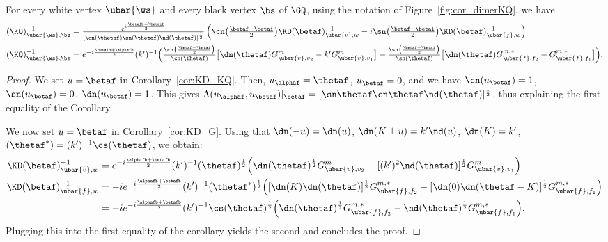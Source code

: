 \documentclass[a4paper,twoside,11pt]{article}
\begin{document}
\begin{cor}\label{cor:gibbsGQ_GD}
For every white vertex $\ubar{\ws}$ and every black vertex $\bs$ of $\GQ$, 
using the notation of Figure~\ref{fig:cor_dimerKQ}, we have
\begin{align*}
(\KQ)^{-1}_{\ubar{\ws},\bs}&=\textstyle\frac{
e^{i\frac{\betafb-\betaib}{2}}}
{[\cn(\thetaf)\sn(\thetaf)\nd(\thetaf)]^{\frac{1}{2}}}
\left(\cn\bigl(\frac{\betaf-\betai}{2}\bigr)\KD(\betaf)^{-1}_{\ubar{v},w}
-i\sn\bigl(\frac{\betaf-\betai}{2}\bigr)\KD(\betaf)^{-1}_{\ubar{f},w}
\right)\\
(\KQ)^{-1}_{\ubar{\ws},\bs}&=\textstyle e^{-i\frac{\betaib+\alphafb}{2}}(k')^{-1}
\Bigl(\frac{\cn\bigl(\frac{\betaf-\betai}{2}\bigr)}{\cn(\thetaf)}
\bigl[\dn(\thetaf) G^m_{\ubar{v},v_2}-k'G^m_{\ubar{v},v_1}\bigr]
-\frac{\sn\bigl(\frac{\betaf-\betai}{2}\bigr)}{\sn(\thetaf)}
\bigl[\dn(\thetaf)G^{m,*}_{\ubar{f},f_2}-G^{m,*}_{\ubar{f},f_1}\bigr]\Bigr).
\end{align*}
\end{cor}
\begin{proof}
We set $u=\betaf$ in Corollary~\ref{cor:KD_KQ}. Then, $u_{\alphaf}=\thetaf$, $u_{\betaf}=0$, and we have $\cn(u_{\betaf})=1$, 
$\sn(u_{\betaf})=0$, $\dn(u_{\betaf})=1$. This gives
$\Lambda(u_{\alphaf},u_{\betaf})\vert_{\betaf}=[\sn\thetaf\cn\thetaf\nd(\thetaf)]^{\frac{1}{2}}$, thus explaining the first equality of the Corollary.

We now set $u=\betaf$ in Corollary~\ref{cor:KD_G}. Using that
$\dn(-u)=\dn(u)$, $\dn(K\pm u)=k'\nd(u)$, $\dn(K)=k'$, $\sc(\thetaf^*)=(k')^{-1}\cs(\thetaf)$, we obtain:
\begin{align*}
\KD(\betaf)^{-1}_{\ubar{v},w}&=e^{-i\frac{\alphafb+\betafb}{2}}(k')^{-1}\sc(\thetaf)^{\frac{1}{2}}
\Bigl(\dn(\thetaf)^{\frac{1}{2}} G^m_{\ubar{v},v_2}-[(k')^{2}\nd(\thetaf)]^{\frac{1}{2}}G^m_{\ubar{v},v_1}\Bigr)\\
\KD(\betaf)^{-1}_{\ubar{f},w}&=-ie^{-i\frac{\alphafb+\betafb}{2}}(k')^{-1}\sc(\thetaf^*)^{\frac{1}{2}}
\Bigl([\dn(K)\dn(\thetaf)]^{\frac{1}{2}}G^{m,*}_{\ubar{f},f_2}-[\dn(0)\dn(\thetaf-K)]^{\frac{1}{2}}G^{m,*}_{\ubar{f},f_1} \Bigr)\\
&=-ie^{-i\frac{\alphafb+\betafb}{2}}(k')^{-1}\cs(\thetaf)^{\frac{1}{2}}
\Bigl(\dn(\thetaf)^{\frac{1}{2}}G^{m,*}_{\ubar{f},f_2}-\nd(\thetaf)^{\frac{1}{2}}G^{m,*}_{\ubar{f},f_1}
\Bigr).
\end{align*}
Plugging this into the first equality of the corollary yields the second and concludes the proof.
\end{proof}
\end{document}

